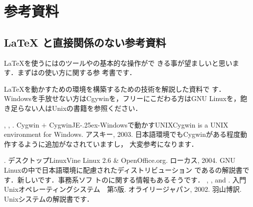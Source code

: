 \chapter{参考資料}

\makeatletter
\def\@hito@keisyo{}
\makeatother

\newBibItem


\section{\LaTeX{} と直接関係のない参考資料}
{\LaTeX}を使うには\unixos のツールや\unixos の基本的な操作がで
きる事が望ましいと思います．まずは\unixos の使い方に関する参
考書です．

{\LaTeX}を動かすための環境を構築するための技術を解説した資料で
す．Windowsを手放せない方はCgywinを，フリーにこだわる方はGNU 
Linuxを，飽き足らない人はUnixの書籍を参照ください．
%
\begin{myreferences}
, , . \newblock
Cygwin $+$ CygwinJE\lower-.25ex\hbox{-}Windowsで動かすUNIX\zdash Cygwin is a 
UNIX environment for Windows. 
アスキー, 2003.
\sanko
日本語環境でもCygwinがある程度動作するように追加がなされていますし，
大変参考になります．


.  \newblock
デスクトップLinux\zdash Vine Linux 2.6 \& OpenOffice.org.
ローカス, 2004.
\sanko
GNU Linuxの中で日本語環境に配慮されたディストリビューション
であるの解説書です．新しいです．事務系ソフ
トのに関する情報もあるそうです．
%
%
, , and 
  . \newblock
入門 Unixオペレーティングシステム　第5版.
オライリージャパン, 2002.
羽山博訳.
\sanko
Unixシステムの解説書です．
\end{myreferences}


